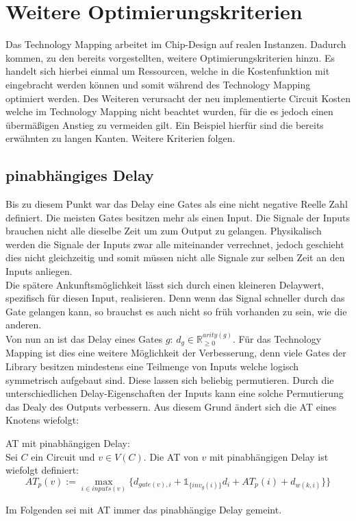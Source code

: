 \documentclass[11pt, a4paper, german]{article}
\newcommand{\TM}{Technology Mapping }
\begin{document}
\section{Weitere Optimierungskriterien}
Das \TM arbeitet im Chip-Design auf realen Instanzen. Dadurch kommen, zu den bereits vorgestellten, weitere Optimierungskriterien hinzu. Es handelt sich hierbei einmal um Ressourcen, welche in die Kostenfunktion mit eingebracht werden können und somit während des \TM optimiert werden. Des Weiteren verursacht der neu implementierte Circuit Kosten welche im \TM nicht beachtet wurden, für die es jedoch einen übermäßigen Anstieg zu vermeiden gilt. Ein Beispiel hierfür sind die bereits erwähnten zu langen Kanten. Weitere Kriterien folgen. 
\subsection{pinabhängiges Delay}
\label{subsec:pinabh_delay}
Bis zu diesem Punkt war das Delay eine Gates als eine nicht negative Reelle Zahl definiert. Die meisten Gates besitzen mehr als einen Input. Die Signale der Inputs brauchen nicht alle dieselbe Zeit um zum Output zu gelangen. Physikalisch werden die Signale der Inputs zwar alle miteinander verrechnet, jedoch geschieht dies nicht gleichzeitig und somit müssen nicht alle Signale zur selben Zeit an den Inputs anliegen.\\
Die spätere Ankunftsmöglichkeit lässt sich durch einen kleineren Delaywert, spezifisch für diesen Input, realisieren. Denn wenn das Signal schneller durch das Gate gelangen kann, so brauchst es auch nicht so früh vorhanden zu sein, wie die anderen. \\
Von nun an ist das Delay eines Gates $g$: $d_g \in \mathbb{R}_{\geq 0}^{arity(g)}$. Für das \TM ist dies eine weitere Möglichkeit der Verbesserung, denn viele Gates der Library besitzen mindestens eine Teilmenge von Inputs welche logisch symmetrisch aufgebaut sind. Diese lassen sich beliebig permutieren. Durch die unterschiedlichen Delay-Eigenschaften der Inputs kann eine solche Permutierung das Dealy des Outputs verbessern. Aus diesem Grund ändert sich die AT eines Knotens wiefolgt: 
\begin{definition}{AT mit pinabhängigen Delay:}\\
	Sei $C$ ein Circuit und $v \in V(C)$. Die AT von $v$ mit pinabhängigen Delay ist wiefolgt definiert: \[ AT_p(v) :=  \max\limits_{i \in inputs(v)} \{   d_{gate(v),i} + \mathbb{1}_{\{inv_g(i) \}} d_{i} + AT_p(i) + d_{w(k,i)} \}   \}\]
\end{definition}
Im Folgenden sei mit AT immer das pinabhängige Delay gemeint.
\end{document}
